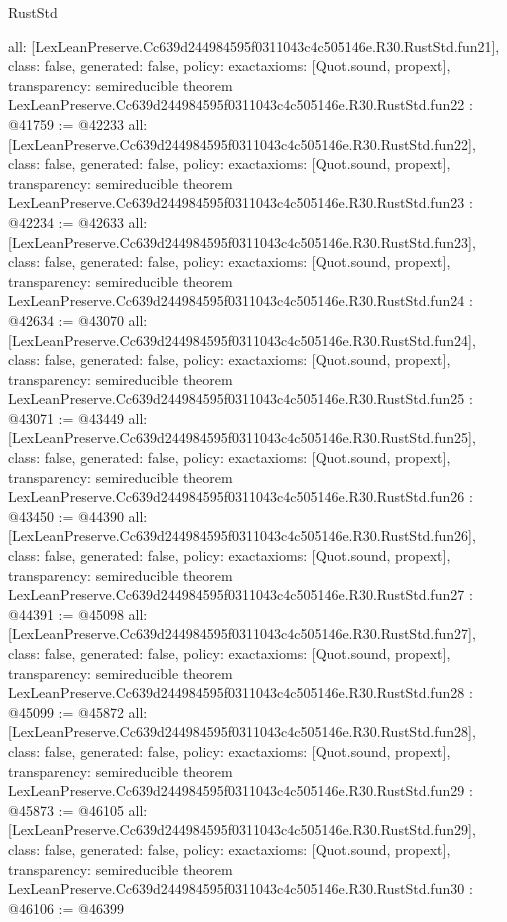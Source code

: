 \begin{lexlean}{RustStd}
\begin{coremodule}
{  all: [LexLeanPreserve.Cc639d244984595f0311043c4c505146e.R30.RustStd.fun21],
  class: false,
  generated: false,
  policy: exact{axioms: [Quot.sound, propext]},
  transparency: semireducible
}
theorem LexLeanPreserve.Cc639d244984595f0311043c4c505146e.R30.RustStd.fun22 : @41759 := @42233 {
  all: [LexLeanPreserve.Cc639d244984595f0311043c4c505146e.R30.RustStd.fun22],
  class: false,
  generated: false,
  policy: exact{axioms: [Quot.sound, propext]},
  transparency: semireducible
}
theorem LexLeanPreserve.Cc639d244984595f0311043c4c505146e.R30.RustStd.fun23 : @42234 := @42633 {
  all: [LexLeanPreserve.Cc639d244984595f0311043c4c505146e.R30.RustStd.fun23],
  class: false,
  generated: false,
  policy: exact{axioms: [Quot.sound, propext]},
  transparency: semireducible
}
theorem LexLeanPreserve.Cc639d244984595f0311043c4c505146e.R30.RustStd.fun24 : @42634 := @43070 {
  all: [LexLeanPreserve.Cc639d244984595f0311043c4c505146e.R30.RustStd.fun24],
  class: false,
  generated: false,
  policy: exact{axioms: [Quot.sound, propext]},
  transparency: semireducible
}
theorem LexLeanPreserve.Cc639d244984595f0311043c4c505146e.R30.RustStd.fun25 : @43071 := @43449 {
  all: [LexLeanPreserve.Cc639d244984595f0311043c4c505146e.R30.RustStd.fun25],
  class: false,
  generated: false,
  policy: exact{axioms: [Quot.sound, propext]},
  transparency: semireducible
}
theorem LexLeanPreserve.Cc639d244984595f0311043c4c505146e.R30.RustStd.fun26 : @43450 := @44390 {
  all: [LexLeanPreserve.Cc639d244984595f0311043c4c505146e.R30.RustStd.fun26],
  class: false,
  generated: false,
  policy: exact{axioms: [Quot.sound, propext]},
  transparency: semireducible
}
theorem LexLeanPreserve.Cc639d244984595f0311043c4c505146e.R30.RustStd.fun27 : @44391 := @45098 {
  all: [LexLeanPreserve.Cc639d244984595f0311043c4c505146e.R30.RustStd.fun27],
  class: false,
  generated: false,
  policy: exact{axioms: [Quot.sound, propext]},
  transparency: semireducible
}
theorem LexLeanPreserve.Cc639d244984595f0311043c4c505146e.R30.RustStd.fun28 : @45099 := @45872 {
  all: [LexLeanPreserve.Cc639d244984595f0311043c4c505146e.R30.RustStd.fun28],
  class: false,
  generated: false,
  policy: exact{axioms: [Quot.sound, propext]},
  transparency: semireducible
}
theorem LexLeanPreserve.Cc639d244984595f0311043c4c505146e.R30.RustStd.fun29 : @45873 := @46105 {
  all: [LexLeanPreserve.Cc639d244984595f0311043c4c505146e.R30.RustStd.fun29],
  class: false,
  generated: false,
  policy: exact{axioms: [Quot.sound, propext]},
  transparency: semireducible
}
theorem LexLeanPreserve.Cc639d244984595f0311043c4c505146e.R30.RustStd.fun30 : @46106 := @46399 {
}
\end{coremodule}
\end{lexlean}
